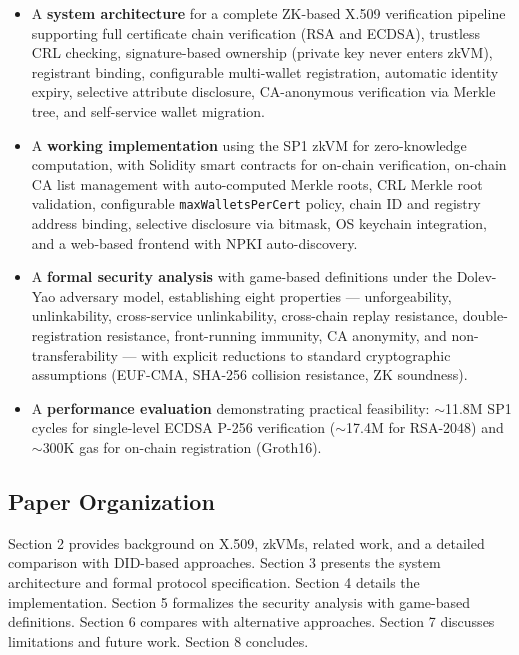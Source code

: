 \documentclass[11pt, a4paper]{article}
\providecommand{\tightlist}{%
  \setlength{\itemsep}{0pt}\setlength{\parskip}{0pt}}
\begin{document}
\begin{itemize}
\tightlist
\item
  A \textbf{system architecture} for a complete ZK-based X.509
  verification pipeline supporting full certificate chain verification
  (RSA and ECDSA), trustless CRL checking, signature-based ownership
  (private key never enters zkVM), registrant binding, configurable
  multi-wallet registration, automatic identity expiry, selective
  attribute disclosure, CA-anonymous verification via Merkle tree, and
  self-service wallet migration.
\item
  A \textbf{working implementation} using the SP1 zkVM for
  zero-knowledge computation, with Solidity smart contracts for on-chain
  verification, on-chain CA list management with auto-computed Merkle
  roots, CRL Merkle root validation, configurable
  \texttt{maxWalletsPerCert} policy, chain ID and registry address
  binding, selective disclosure via bitmask, OS keychain integration,
  and a web-based frontend with NPKI auto-discovery.
\item
  A \textbf{formal security analysis} with game-based definitions under
  the Dolev-Yao adversary model, establishing eight properties ---
  unforgeability, unlinkability, cross-service unlinkability, cross-chain replay resistance, double-registration resistance,
  front-running immunity, CA anonymity, and non-transferability --- with
  explicit reductions to standard cryptographic assumptions (EUF-CMA,
  SHA-256 collision resistance, ZK soundness).
\item
  A \textbf{performance evaluation} demonstrating practical feasibility:
  $\sim$11.8M SP1 cycles for single-level ECDSA P-256
  verification ($\sim$17.4M for RSA-2048) and
  $\sim$300K gas for on-chain registration (Groth16).
\end{itemize}

\subsection{Paper Organization}\label{paper-organization}

Section 2 provides background on X.509, zkVMs, related work, and a
detailed comparison with DID-based approaches. Section 3 presents the
system architecture and formal protocol specification. Section 4 details
the implementation. Section 5 formalizes the security analysis with
game-based definitions. Section 6 compares with alternative approaches.
Section 7 discusses limitations and future work. Section 8 concludes.
\end{document}
